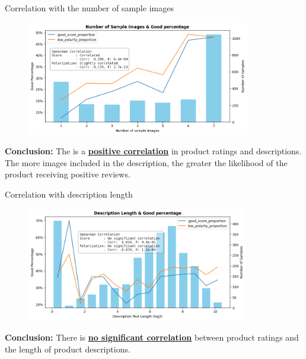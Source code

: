 \begin{frame}{Correlation with the number of sample images}

	\begin{figure}
		\centering
			\includegraphics[height=5cm]{pic/corr_n_image.png}
	\end{figure}

    \textbf{Conclusion:} The is a \underline{\textbf{positive correlation}} in product ratings and descriptions. The more images included in the description, the greater the likelihood of the product receiving positive reviews.

\end{frame}

\begin{frame}{Correlation with description length}

	\begin{figure}
		\centering
			\includegraphics[height=5cm]{pic/corr_len_text.png}
	\end{figure}

    \textbf{Conclusion:} There is \underline{\textbf{no significant correlation}} between product ratings and the length of product descriptions.

\end{frame}


